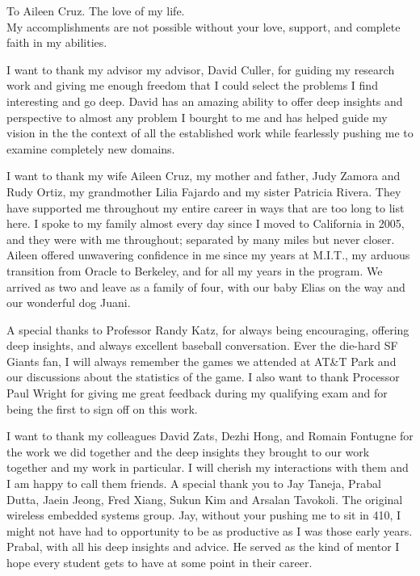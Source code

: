 \documentclass{ucbthesis}
\begin{document}
\begin{frontmatter}

\begin{dedication}
\null\vfil
\begin{center}
To Aileen Cruz.  The love of my life.\\\vspace{12pt}
My accomplishments are not possible without your love, support, and complete faith in my abilities.
\end{center}
\vfil\null
\end{dedication}

\tableofcontents
\clearpage
\listoffigures
\clearpage
\listoftables

\begin{acknowledgements}
I want to thank my advisor my advisor, David Culler, for guiding my research work and giving me enough
freedom that I could select the problems I find interesting and go deep.  David has an amazing ability to
offer deep insights and perspective to almost any problem I bourght to me and has helped guide my vision in 
the the context of all the established work while fearlessly pushing me to examine completely new domains.

I want to thank my wife Aileen Cruz, my mother and father, Judy Zamora and Rudy Ortiz, my 
grandmother Lilia Fajardo and my sister Patricia Rivera.  They have supported me throughout my entire career in ways
that are too long to list here. I spoke to my family almost every day since I moved to California in 2005, and they
were with me throughout; separated by many miles but never closer.  Aileen offered unwavering confidence in me since 
my years at M.I.T., my arduous transition from Oracle to Berkeley, 
and for all my years in the program.  We arrived as two and leave as a family of four, with our baby Elias on the way and 
our wonderful dog Juani.  

A special thanks to Professor Randy Katz, for always being encouraging, offering deep insights, and always
excellent baseball conversation.  Ever the die-hard SF Giants fan, I will always remember the games we attended
at AT\&T Park and our discussions about the statistics of the game.
I also want to thank Processor Paul Wright for giving me great feedback during my qualifying exam and for being the first
to sign off on this work.

I want to thank my colleagues David Zats, Dezhi Hong, and Romain Fontugne for the work we did together and the deep
insights they brought to our work together and my work in particular.  I will cherish my interactions with them and I am
happy to call them friends.  A special thank you to Jay Taneja, Prabal Dutta, Jaein Jeong, Fred Xiang, Sukun Kim and Arsalan 
Tavokoli.  The original wireless
embedded systems group.  Jay, without your pushing me to sit in 410, I might not have had to opportunity to be 
as productive as I was those early years.  Prabal, with all his deep insights and advice.  He served as the kind of
mentor I hope every student gets to have at some point in their career.


\end{acknowledgements}
\end{frontmatter}
\end{document}
